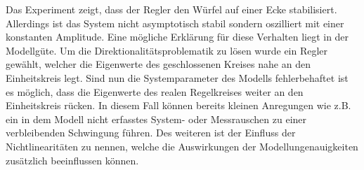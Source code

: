 Das Experiment zeigt, dass der Regler den Würfel auf einer Ecke stabilisiert. Allerdings ist das System nicht asymptotisch stabil sondern oszilliert mit einer konstanten Amplitude. Eine mögliche Erklärung für diese Verhalten liegt in der Modellgüte. Um die Direktionalitätsproblematik zu lösen wurde ein Regler gewählt, welcher die Eigenwerte des geschlossenen Kreises nahe an den Einheitskreis legt. Sind nun die Systemparameter des Modells fehlerbehaftet ist es möglich, dass die Eigenwerte des realen Regelkreises weiter  an den Einheitskreis rücken. In diesem Fall können bereits kleinen Anregungen wie z.B. ein in dem Modell nicht erfasstes System- oder Messrauschen zu einer verbleibenden Schwingung führen. Des weiteren ist der Einfluss der Nichtlinearitäten zu nennen, welche die Auswirkungen der Modellungenauigkeiten zusätzlich beeinflussen können. 

